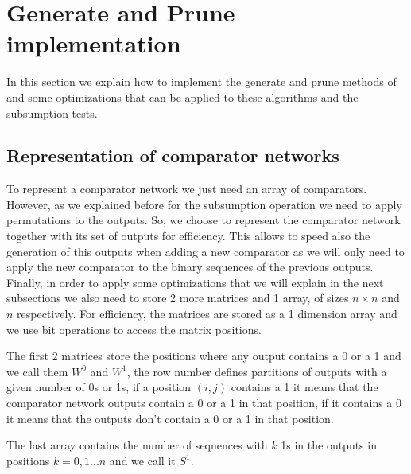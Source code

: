 \documentclass[../main.tex]{subfiles}
\begin{document}
	\section{Generate and Prune implementation}
	In this section we explain how to implement the generate and prune methods of \cite{sortingnineinputs} and some optimizations that can be applied to these algorithms and the subsumption tests. 
	
	\subsection{Representation of comparator networks}
	To represent a comparator network we just need an array of comparators. However, as we explained before for the subsumption operation we need to apply permutations to the outputs. So, we choose to represent the comparator network together with its set of outputs for efficiency. This allows to speed also the generation of this outputs when adding a new comparator as we will only need to apply the new comparator to the binary sequences of the previous outputs. Finally, in order to apply some optimizations that we will explain in the next subsections we also need to store 2 more matrices and 1 array, of sizes $n \times n$ and $n$ respectively. For efficiency, the matrices are stored as a 1 dimension array and we use bit operations to access the matrix positions. 
	
	The first 2 matrices store the positions where any output contains a 0 or a 1 and we call them $W^0$ and $W^1$, the row number defines partitions of outputs with a given number of 0s or 1s, if a position $(i,j)$ contains a 1 it means that the comparator network outputs contain a 0 or a 1 in that position, if it contains a 0 it means that the outputs don't contain a 0 or a 1 in that position. 
	
	The last array contains the number of sequences with $k$ 1s in the outputs in positions $k=0,1...n$ and we call it $S^{1}$.
	
\end{document}
